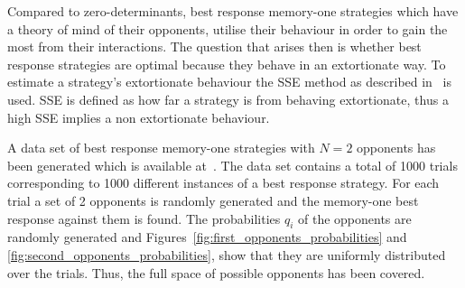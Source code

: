 \documentclass[10pt]{article}
\begin{document}
Compared to zero-determinants, best response memory-one strategies which
have a theory of mind of their opponents, utilise their behaviour in order to
gain the most from their interactions. The question that arises then is whether
best response strategies are optimal because they behave in an extortionate
way. To estimate a strategy's extortionate
behaviour the SSE method as described in~\cite{Knight2019} is used. SSE is
defined as how far a strategy is from behaving extortionate, thus a high
SSE implies a non extortionate behaviour.


A data set of best response memory-one strategies with \(N=2\) opponents has been
generated which is available at~\cite{glynatsi2019}. The data set contains a total of 1000 trials
corresponding to 1000 different instances of a best response strategy. For each
trial a set of 2 opponents is randomly generated and the memory-one best response
against them is found. The probabilities \(q_i\) of the opponents are
randomly generated and Figures~\ref{fig:first_opponents_probabilities} and
\ref{fig:second_opponents_probabilities}, show that they are uniformly
distributed over the trials. Thus, the full space of possible opponents has been
covered.
\end{document}
